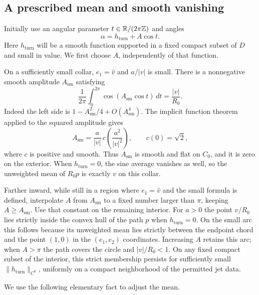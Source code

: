 \subsection{A prescribed mean and smooth vanishing}

Initially use an angular parameter $t\in\mathbb{R}/(2\pi\mathbb Z)$ and angles
\begin{equation}
 \alpha=h_{\mathrm{turn}}+A\cos t.
 \label{eq:unreparametrized-angle}
\end{equation}
Here $h_{\mathrm{turn}}$ will be a smooth function supported in a fixed
compact subset of $D$ and small in value.  We first choose $A$, independently
of that function.

On a sufficiently small collar, $e_1=\widehat v$ and $a/|v|$ is small.
There is a nonnegative smooth amplitude $A_{\mathrm{sm}}$ satisfying
\begin{equation}
 \frac1{2\pi}\int_0^{2\pi}\cos(A_{\mathrm{sm}}\cos t)\,dt
 =\frac{|v|}{R_0}.
 \label{eq:small-arc-mean}
\end{equation}
Indeed the left side is $1-A_{\mathrm{sm}}^2/4+O(A_{\mathrm{sm}}^4)$.
The implicit function theorem applied to the squared amplitude gives
\begin{equation}
 A_{\mathrm{sm}}=\frac a{|v|}\,
 c\left(\frac{a^2}{|v|^2}\right),\qquad c(0)=\sqrt2,
 \label{eq:smooth-small-amplitude}
\end{equation}
where $c$ is positive and smooth.  Thus $A_{\mathrm{sm}}$ is smooth and
flat on $C_0$, and it is zero on the exterior.  When
$h_{\mathrm{turn}}=0$, the sine average vanishes as well, so the
unweighted mean of $R_0p$ is exactly $v$ on this collar.

Farther inward, while still in a region where $e_1=\widehat v$ and the
small formula is defined, interpolate $A$ from $A_{\mathrm{sm}}$ to a
fixed number larger than $\pi$, keeping $A\ge A_{\mathrm{sm}}$.
Use that constant on the remaining interior.  For $a>0$ the point
$v/R_0$ lies strictly inside the convex hull of the path $p$ when
$h_{\mathrm{turn}}=0$.  On the small arc this follows because its
unweighted mean lies strictly between the endpoint chord and the point
$(1,0)$ in the $(e_1,e_2)$ coordinates.  Increasing $A$ retains this arc;
when $A>\pi$ the path covers the circle and $|v|/R_0<1$.
On any fixed compact subset of the interior, this strict membership
persists for sufficiently small $\|h_{\mathrm{turn}}\|_{C^0}$, uniformly
on a compact neighborhood of the permitted jet data.

We use the following elementary fact to adjust the mean.

